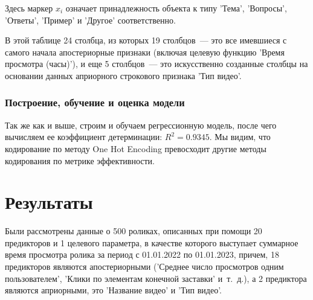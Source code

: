 \documentclass[a4paper,12pt]{article}
\begin{document}
\noindent
Здесь маркер $x_i$ означает принадлежность объекта к типу 'Тема', 'Вопросы', 'Ответы', 'Пример' и 'Другое' соответственно.

В этой таблице 24 столбца, из которых 19 столбцов~--- это все имевшиеся с самого начала апостериорные признаки (включая целевую функцию 'Время просмотра (часы)'), и еще 5 столбцов~--- это искусственно созданные столбцы на основании данных априорного строкового признака 'Тип видео'. 

\subsubsection{Построение, обучение и оценка модели}

Так же как и выше, строим и обучаем регрессионную модель, после чего вычисляем ее коэффициент детерминации: $R^2 = 0.9345$. Мы видим, что кодирование по методу One Hot Encoding превосходит другие методы кодирования по метрике эффективности.


\section{Результаты}
Были рассмотрены данные о 500 роликах, описанных при помощи 20 предикторов и 1 целевого параметра, в качестве которого выступает суммарное время просмотра ролика за период с 01.01.2022 по 01.01.2023, причем, 18 предикторов являются апостериорными ('Среднее число просмотров одним пользователем', 'Клики по элементам конечной заставки' и т. д.), а 2 предиктора являются априорными, это 'Название видео' и 'Тип видео'.
\end{document}
